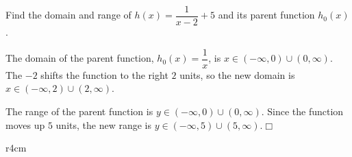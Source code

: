 \documentclass[lang=en,11pt]{elegantbook}
\begin{document}
\begin{example}
Find the domain and range of $h(x)=\dfrac{1}{x-2}+5$ and its parent function $h_0(x)$.
\end{example}
\begin{solution}
The domain of the parent function, $h_0(x)=\dfrac{1}{x}$, is $x\in(-\infty,0)\cup(0,\infty)$.  The $-2$ shifts the function to the right $2$ units, so the new domain is $x\in(-\infty,2)\cup(2,\infty)$.

The range of the parent function is $y\in(-\infty,0)\cup(0,\infty)$.  Since the function moves up $5$ units, the new range is $y\in(-\infty,5)\cup(5,\infty)$.$\Box$
\end{solution}

\begin{wrapfigure}{r}{4cm}
    \centering
\end{wrapfigure}
\end{document}
